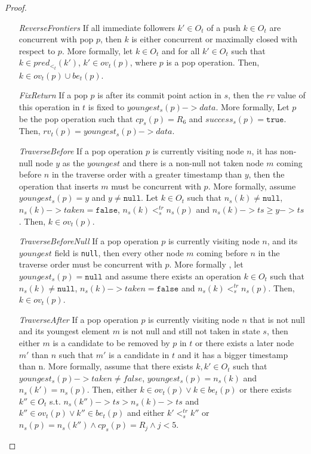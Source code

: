\documentclass{article}
\begin{document}
\begin{proof}
\begin{itemize}
\item[\emph{ReverseFrontiers}] If all immediate followers $k' \in O_t$ of a push $k \in O_t$ are concurrent with pop $p$, then $k$ is either concurrent or maximally closed with respect to $p$. More formally, let $k \in O_t$ and for all $k' \in O_t$ such that $k \in pred_{<_t}(k')$, $k' \in ov_t(p)$, where $p$ is a pop operation. Then, $k \in ov_t(p) \cup be_t(p)$. 
\item[\emph{FixReturn}] If a pop $p$ is after its commit point action in $s$, then the $rv$ value of this operation in $t$ is fixed to $youngest_s(p)->data$. More formally, Let $p$ be the pop operation such that $cp_s(p) = R_6$ and $success_s(p) = \texttt{true}$. Then, $rv_t(p) = youngest_s(p)->data$. 
\item[\emph{TraverseBefore}] If a pop operation $p$ is currently visiting node $n$, it has non-null node $y$ as the $youngest$ and there is a non-null not taken node $m$ coming before $n$ in the traverse order with a greater timestamp than $y$, then the operation that inserts $m$ must be concurrent with $p$. More formally, assume $youngest_s(p) = y$ and $ y \neq \texttt{null}$. Let $k \in O_t$ such that $n_s(k) \neq \texttt{null}$, $n_s(k)->taken = \texttt{false}$, $n_s(k) <^{tr}_s n_s(p)$ and $n_s(k)->ts \geq y->ts$. Then, $k \in ov_t(p)$.
\item[\emph{TraverseBeforeNull}] If a pop operation $p$ is currently visiting node $n$, and its $youngest$ field is \texttt{null}, then every other node $m$ coming before $n$ in the traverse order must be concurrent with $p$. More formally , let $youngest_s(p) = \texttt{null}$ and assume there exists  an operation $k \in O_t$ such that $n_s(k) \neq \texttt{null}$, $n_s(k)->taken = \texttt{false}$ and  $n_s(k) <^{tr}_s n_s(p)$. Then, $k \in ov_t(p)$. 
\item[\emph{TraverseAfter}] If a pop operation $p$ is currently visiting node $n$ that is not null and its youngest element $m$ is not null and still not taken in state $s$, then either $m$ is a candidate to be removed by $p$ in $t$ or there exists a later node $m'$ than $n$ such that $m'$ is a candidate in $t$ and it has a bigger timestamp than n. More formally, assume that there exists $k, k' \in O_t$ such that $youngest_s(p)->taken \neq false$, $youngest_s(p) = n_s(k)$ and $n_s(k') = n_s(p)$. Then, either $k \in ov_t(p) \vee k \in be_t(p)$ or there exists $k'' \in O_t$ s.t. $n_s(k'')->ts > n_s(k) ->ts$ and $k'' \in ov_t(p) \vee k'' \in be_t(p)$ and either $k' <^{tr}_s k''$ or $n_s(p) = n_s(k'') \wedge cp_s(p) = R_j \wedge j<5$. 

\end{itemize}
\end{proof}
\end{document}

